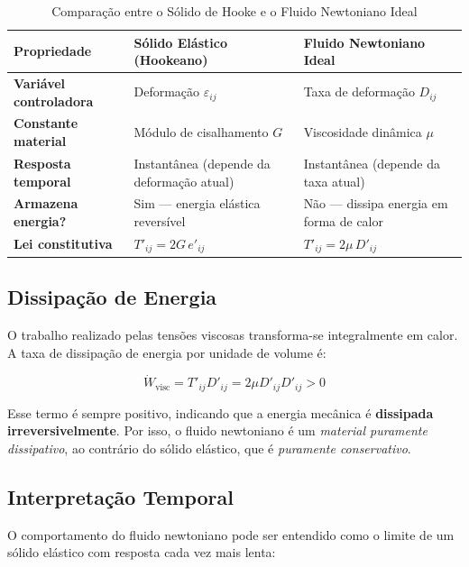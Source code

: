 \begin{table}[bht]
\centering
\caption{Comparação entre o Sólido de Hooke e o Fluido Newtoniano Ideal}
\label{tab:hooke_newton}
\renewcommand{\arraystretch}{1.3}
\setlength{\tabcolsep}{6pt}
\begin{tabularx}{0.95\textwidth}{|>{\raggedright\arraybackslash}p{3cm}|>{\raggedright\arraybackslash}X|>{\raggedright\arraybackslash}X|}
\hline
\textbf{Propriedade} & \textbf{Sólido Elástico (Hookeano)} & \textbf{Fluido Newtoniano Ideal} \\
\hline
\textbf{Variável controladora} & Deformação $\varepsilon_{ij}$ & Taxa de deformação $D_{ij}$ \\
\hline
\textbf{Constante material} & Módulo de cisalhamento $G$ & Viscosidade dinâmica $\mu$ \\
\hline
\textbf{Resposta temporal} & Instantânea (depende da deformação atual) & Instantânea (depende da taxa atual) \\
\hline
\textbf{Armazena energia?} & Sim — energia elástica reversível & Não — dissipa energia em forma de calor \\
\hline
\textbf{Lei constitutiva} & $T'_{ij} = 2G\,e'_{ij}$ & $T'_{ij} = 2\mu\,D'_{ij}$ \\
\hline
\end{tabularx}
\end{table}


\subsection{Dissipação de Energia}

O trabalho realizado pelas tensões viscosas transforma-se integralmente em calor.  
A taxa de dissipação de energia por unidade de volume é:

\[
\dot{W}_\text{visc} = T'_{ij} D'_{ij} = 2\mu D'_{ij}D'_{ij} > 0
\]

Esse termo é sempre positivo, indicando que a energia mecânica é \textbf{dissipada irreversivelmente}.  
Por isso, o fluido newtoniano é um \textit{material puramente dissipativo}, ao contrário do sólido elástico, que é \textit{puramente conservativo}.



\subsection{Interpretação Temporal}

O comportamento do fluido newtoniano pode ser entendido como o limite de um sólido elástico com resposta cada vez mais lenta:


